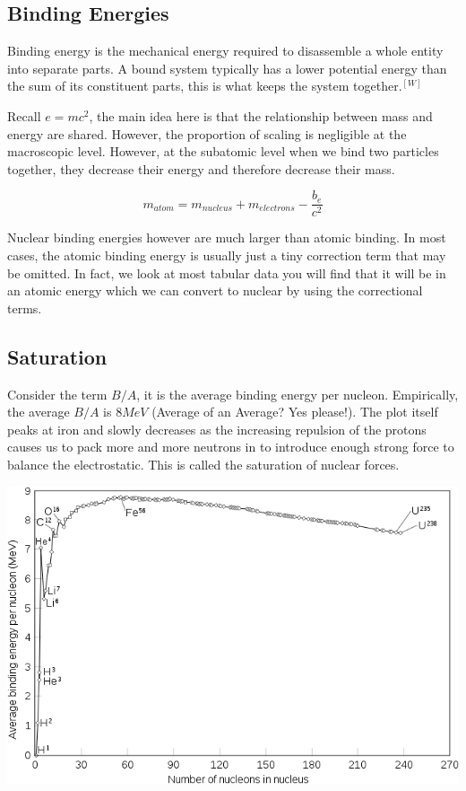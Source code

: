 \documentclass[english, 11pt]{article}
\begin{document}
\subsection{Binding Energies}

\begin{defn}\label{be}
Binding energy is the mechanical energy required to disassemble a whole entity into separate parts. A bound system typically has a lower potential energy than the sum of its constituent parts, this is what keeps the system together.$^{[W]}$
\end{defn}

Recall $e=mc^2$, the main idea here is that the relationship between mass and energy are shared. However, the proportion of scaling is negligible at the macroscopic level. However, at the subatomic level when we bind two particles together, they decrease their energy and therefore decrease their mass.

\begin{exmp}
\[  m_{atom} = m_{nucleus} + m_{electrons} - \frac{b_{e}}{c^2} \]
\end{exmp}

Nuclear binding energies however are much larger than atomic binding. In most cases, the atomic binding energy is usually just a tiny correction term that may be omitted. In fact, we look at most tabular data you will find that it will be in an atomic energy which we can convert to nuclear by using the correctional terms.\\

\subsection{Saturation}
Consider the term $B/A$, it is the average binding energy per nucleon. Empirically, the average $B/A$ is $8 MeV$ (Average of an Average? Yes please!). The plot itself peaks at iron and slowly decreases as the increasing repulsion of the protons causes us to pack more and more neutrons in to introduce enough strong force to balance the electrostatic. This is called the saturation of nuclear forces.

\begin{center}\label{plot}
 \includegraphics[scale=0.5 ]{../img/ba}
\end{center}
\end{document}
